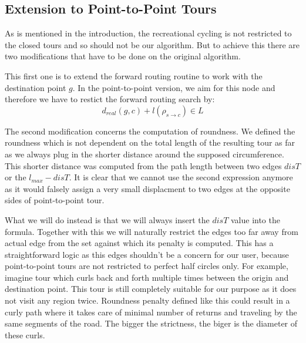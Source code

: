 \documentclass{ctuthesis}
\begin{document}
\subsection{Extension to Point-to-Point Tours} \label{sec:ext}
As is mentioned in the introduction, the recreational cycling is not restricted to the closed tours and so should not be our algorithm. But to achieve this there are two modifications that have to be done on the original algorithm. \par
This first one is to extend the forward routing routine to work with the destination point \(g\). In the point-to-point version, we aim for this node and therefore we have to restict the forward routing search by:
\begin{equation}
d_{real}(g, c) + l(\rho_{s \rightarrow c}) \in L
\end{equation}
\par
The second modification concerns the computation of roundness. We defined the roundness which is not dependent on the total length of the resulting tour as far as we always plug in the shorter distance around the supposed circumference. This shorter distance was computed from the path length between two edges \(disT\) or the \(l_{max}-disT\). It is clear that we cannot use the second expression anymore as it would falsely assign a very small displacment to two edges at the opposite sides of point-to-point tour. \par 
What we will do instead is that we will always insert the \(disT\) value into the formula. Together with this we will naturally restrict the edges too far away from actual edge from the set against which its penalty is computed. This has a straightforward logic as this edges shouldn't be a concern for our user, because point-to-point tours are not restricted to perfect half circles only. For example, imagine tour which curls back and forth multiple times between the origin and destination point. This tour is still completely suitable for our purpose as it does not visit any region twice. Roundness penalty defined like this could result in a curly path where it takes care of minimal number of returns and traveling by the same segments of the road. The bigger the strictness, the biger is the diameter of these curls.
\end{document}
